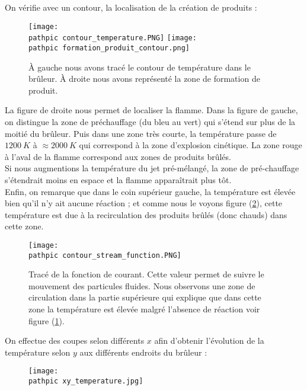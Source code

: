 \documentclass[a4paper,10pt]{article}
\newcommand\pathpic{/home/saura/Documents/Latex_files/Pic/BE_combustion/tp2/}
\begin{document}

\noindent On vérifie avec un contour, la localisation de la création de produits :

\begin{figure}[ht!]
\centering
\texttt{[image: \\pathpic contour\_temperature.PNG]} \hfill
\texttt{[image: \\pathpic formation\_produit\_contour.png]}
\caption{À gauche nous avons tracé le contour de température dans le brûleur. À droite nous avons représenté la zone de formation de produit.}
\label{formation}
\end{figure}

\noindent La figure de droite nous permet de localiser la flamme. Dans la figure de gauche, on distingue la zone de préchauffage (du bleu au vert) qui s'étend sur plus de la moitié du brûleur. Puis dans une zone très courte, la température passe de $1200\ K$ à $\approx 2000\ K$ qui correspond à la zone d'explosion cinétique. La zone rouge à l'aval de la flamme correspond aux zones de produits brûlés. \\
Si nous augmentions la température du jet pré-mélangé, la zone de pré-chauffage s'étendrait moins en espace et la flamme apparaîtrait plus tôt. \\   
Enfin, on remarque que dans le coin supérieur gauche, la température est élevée bien qu'il n'y ait aucune réaction ; et comme nous le voyons figure (\ref{stream}), cette température est due à la recirculation des produits brûlés (donc chauds) dans cette zone.

\begin{figure}[ht!]
\centering
\texttt{[image: \\pathpic contour\_stream\_function.PNG]}
\caption{Tracé de la fonction de courant. Cette valeur permet de suivre le mouvement des particules fluides. Nous observons une zone de circulation dans la partie supérieure qui explique que dans cette zone la température est élevée malgré l'absence de réaction voir figure (\ref{formation}).}
\label{stream}
\end{figure}

On effectue des coupes selon différents $x$ afin d'obtenir l'évolution de la température selon $y$ aux différents endroits du brûleur :

\begin{figure}[ht!]
\centering
\texttt{[image: \\pathpic xy\_temperature.jpg]}
\caption{}
\label{temperature_densite} 
\end{figure}
\end{document}

